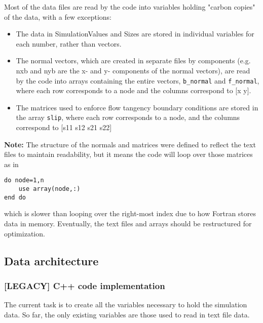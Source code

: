 \documentclass[12pt]{article}
\begin{document}
        Most of the data files are read by the code into variables holding "carbon copies" of the data, with a few exceptions:
        \begin{itemize}
            \item The data in SimulationValues and Sizes are stored in individual variables for each number, rather than vectors.
            \item The normal vectors, which are created in separate files by components (e.g. nxb and nyb are the x- and y- components of the normal vectors), are read by the code into arrays containing the entire vectors, \texttt{b\_normal} and \texttt{f\_normal}, where each row corresponds to a node and the columns correspond to [x y].
            \item The matrices used to enforce flow tangency boundary conditions are stored in the array \texttt{slip}, where each row corresponds to a node, and the columns correspond to [s11 s12 s21 s22]
        \end{itemize}
        \textbf{Note:} The structure of the normals and matrices were defined to reflect the text files to maintain readability, but it means the code will loop over those matrices as in
        \begin{verbatim}
do node=1,n
    use array(node,:)
end do
        \end{verbatim}
        which is slower than looping over the right-most index due to how Fortran stores data in memory. Eventually, the text files and arrays should be restructured for optimization.

    \subsection{Data architecture}
    \subsubsection*{[LEGACY] C++ code implementation}
        The current task is to create all the variables necessary to hold the simulation data. So far, the only existing variables are those used to read in text file data.
            
\end{document}
